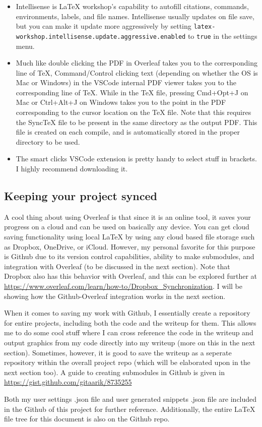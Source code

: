 \begin{itemize}
    \item 
    Intellisense is LaTeX workshop's capability to autofill citations, commands, environments, labels, and file names. Intellisense usually updates on file save, but you can make it update more aggressively by setting \verb|latex-workshop.intellisense.update.aggressive.enabled| to \verb|true| in the settings menu.

    \item 
    Much like double clicking the PDF in Overleaf takes you to the corresponding line of TeX, Command/Control clicking text (depending on whether the OS is Mac or Windows) in the VSCode internal PDF viewer takes you to the corresponding line of TeX. While in the TeX file, pressing Cmd+Opt+J on Mac or Ctrl+Alt+J on Windows takes you to the point in the PDF corresponding to the cursor location on the TeX file. Note that this requires the SyncTeX file to be present in the same directory as the output PDF. This file is created on each compile, and is automatically stored in the proper directory to be used.

    \item The smart clicks VSCode extension is pretty handy to select stuff in brackets. I highly recommend downloading it.
    
\end{itemize}

\subsection{Keeping your project synced}
A cool thing about using Overleaf is that since it is an online tool, it saves your progress on a cloud and can be used on basically any device. You can get cloud saving functionality using local \LaTeX{} by using any cloud based file storage such as Dropbox, OneDrive, or iCloud. However, my personal favorite for this purpose is Github due to its version control capabilities, ability to make submodules, and integration with Overleaf (to be discussed in the next section). Note that Dropbox also has this behavior with Overleaf, and this can be explored further at \url{https://www.overleaf.com/learn/how-to/Dropbox_Synchronization}. I will be showing how the Github-Overleaf integration works in the next section. 

When it comes to saving my work with Github, I essentially create a repository for entire projects, including both the code and the writeup for them. This allows me to do some cool stuff where I can cross reference the code in the writeup and output graphics from my code directly into my writeup (more on this in the next section). Sometimes, however, it is good to save the writeup as a seperate repository within the overall project repo (which will be elaborated upon in the next section too). A guide to creating submodules in Github is given in \url{https://gist.github.com/gitaarik/8735255}


Both my user settings .json file and user generated snippets .json file are included in the Github of this project for further reference. Additionally, the entire \LaTeX{} file tree for this document is also on the Github repo.

